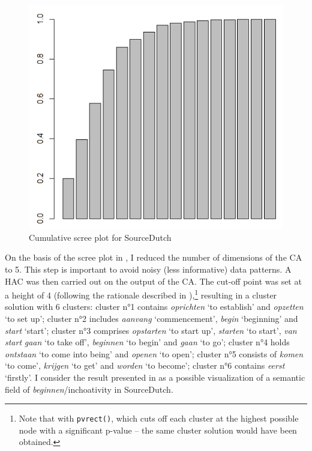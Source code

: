 \begin{figure}
\includegraphics[height=.4\textheight]{figures/Vandevoorde2-img51.png}
\caption{\label{fig:4:51}Cumulative scree plot for SourceDutch}
\end{figure}

On the basis of the scree plot in , I reduced the number of dimensions of the CA to 5. This step is important to avoid noisy (less informative) data patterns. A HAC was then carried out on the output of the CA. The cut-off point was set at a height of 4 (following the rationale described in ),\footnote{Note that with \texttt{pvrect()}, which cuts off each cluster at the highest possible node with a significant p-value – the same cluster solution would have been obtained.} resulting in a cluster solution with 6 clusters: cluster n°1 contains \textit{oprichten} `to establish' and \textit{opzetten} `to set up'; cluster n°2 includes \textit{aanvang} `commencement', \textit{begin} `beginning' and \textit{start} `start'; cluster n°3 comprises \textit{opstarten} `to start up', \textit{starten} `to start', \textit{van} \textit{start} \textit{gaan} `to take off', \textit{beginnen} `to begin' and \textit{gaan} `to go'; cluster n°4 holds \textit{ontstaan} `to come into being' and \textit{openen} `to open'; cluster n°5 consists of \textit{komen} `to come', \textit{krijgen} `to get' and \textit{worden} `to become'; cluster n°6 contains \textit{eerst} `firstly'. I consider the result presented in  as a possible visualization of a semantic field of \textit{beginnen}/inchoativity in SourceDutch.

